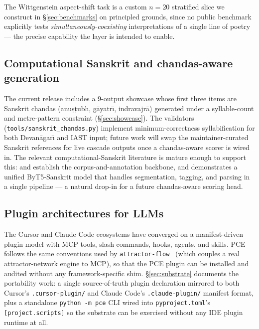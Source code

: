 The Wittgenstein aspect-shift task is a custom $n\!=\!20$ stratified slice we construct in \S\ref{sec:benchmarks} on principled grounds, since no public benchmark explicitly tests \emph{simultaneously-coexisting} interpretations of a single line of poetry --- the precise capability the  layer is intended to enable.

\subsection{Computational Sanskrit and chandas-aware generation}

The current release includes a 9-output showcase whose first three items are Sanskrit chandas (anu\d{s}\d{t}ubh, g\=ayatr\={\i}, indravajr\=a) generated under a syllable-count and metre-pattern constraint (\S\ref{sec:showcase}). The validators (\texttt{tools/sanskrit\_chandas.py}) implement minimum-correctness syllabification for both Devan\=agar\={\i} and IAST input; future work will swap the maintainer-curated Sanskrit references for live cascade outputs once a chandas-aware scorer is wired in. The relevant computational-Sanskrit literature is mature enough to support this: \citet{HellwigEtAl2023VedicSanskritDependencyParsing} and \citet{HellwigBiagetti2025SanskritSembank} establish the corpus-and-annotation backbone, and \citet{NehrdichEtAl2024ByT5Sanskrit} demonstrates a unified ByT5-Sanskrit model that handles segmentation, tagging, and parsing in a single pipeline --- a natural drop-in for a future chandas-aware scoring head.

\subsection{Plugin architectures for LLMs}

The Cursor and Claude Code ecosystems have converged on a manifest-driven plugin model with MCP tools, slash commands, hooks, agents, and skills. PCE follows the same conventions used by \texttt{attractor-flow}~\citep{AttractorFlow2025} (which couples a real attractor-network engine to MCP), so that the PCE plugin can be installed and audited without any framework-specific shim. \S\ref{sec:substrate} documents the portability work: a single source-of-truth plugin declaration mirrored to both Cursor's \texttt{.cursor-plugin/} and Claude Code's \texttt{.claude-plugin/} manifest format, plus a standalone \texttt{python -m pce} CLI wired into \texttt{pyproject.toml}'s \texttt{[project.scripts]} so the substrate can be exercised without any IDE plugin runtime at all.
